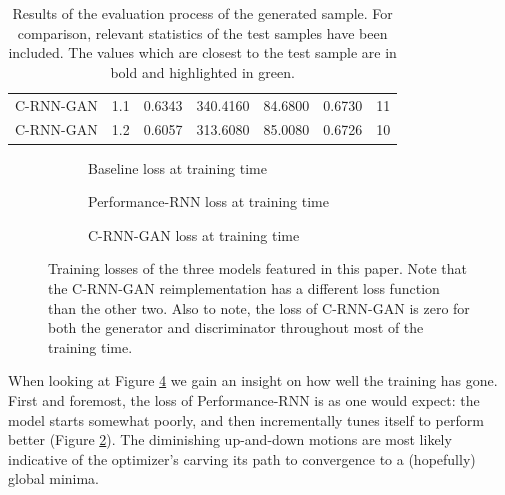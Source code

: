 \documentclass[a4paper]{book}
\begin{document}
\begin{landscape}
\begin{table}[t]
\begin{tabular}{l|l|l|l|l|l|l}
C-RNN-GAN         & 1.1         & 0.6343          & 340.4160          & 84.6800          & 0.6730            & 11      \\
C-RNN-GAN         & 1.2         & 0.6057          & 313.6080          & 85.0080          & 0.6726            & 10     
\end{tabular}
\caption{Results of the evaluation process of the generated sample. For comparison, relevant statistics of the test samples have been included. The values which are closest to the test sample are in bold and highlighted in green.}
\label{tab:results}
\end{table}
\end{landscape}

\begin{figure}[ht]
    \newlength\figureheight
    \newlength\figurewidth
    \setlength\figureheight{6cm}
    \setlength\figurewidth{6cm}

    \begin{subfigure}{0.5\linewidth}
        \centering
        
        \caption{Baseline loss at training time}
        \label{fig:loss_baseline}
    \end{subfigure}
    \begin{subfigure}{0.5\linewidth}
        \centering
        
        \caption{Performance-RNN loss at training time}
        \label{fig:loss_performancernn}
    \end{subfigure}

    \setlength\figureheight{10cm}
    \setlength\figurewidth{10cm}

    \begin{subfigure}{\linewidth}
        \centering
        
        \caption{C-RNN-GAN loss at training time}
        \label{fig:loss_crnngan}
    \end{subfigure}
    \caption{Training losses of the three models featured in this paper. Note that the C-RNN-GAN reimplementation has a different loss function than the other two. Also to note, the loss of C-RNN-GAN is zero for both the generator and discriminator throughout most of the training time.}
    \label{fig:loss}
\end{figure}

When looking at Figure \ref{fig:loss} we gain an insight on how well the training has gone. First and foremost, the loss of Performance-RNN is as one would expect: the model starts somewhat poorly, and then incrementally tunes itself to perform better (Figure \ref{fig:loss_performancernn}). The diminishing up-and-down motions are most likely indicative of the optimizer's carving its path to convergence to a (hopefully) global minima.
\end{document}
